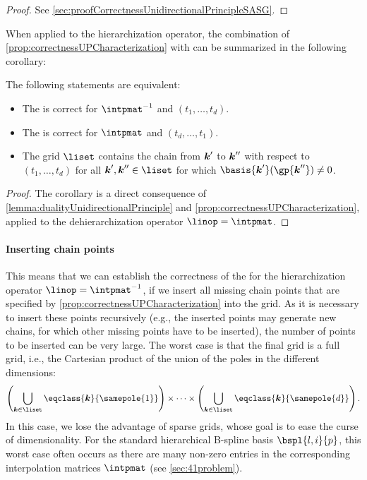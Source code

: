 \begin{proof}
  See \cref{sec:proofCorrectnessUnidirectionalPrincipleSASG}.
\end{proof}

When applied to the hierarchization operator,
the combination of \cref{prop:correctnessUPCharacterization} with
 can be summarized in
the following corollary:

\begin{corollary}
  \label{cor:equivalentCorrectnessUPHierarchization}
  The following statements are equivalent:
  \begin{itemize}
    \item
    The \up is correct for $\intpmatinv$ and $(t_1, \dotsc, t_d)$.
    
    \item
    The \up is correct for $\intpmat$ and $(t_d, \dotsc, t_1)$.
    
    \item
    The grid $\liset$ contains the chain from ${\boldsymbol{k}}'$ to ${\boldsymbol{k}}''$
    with respect to $(t_1, \dotsc, t_d)$ for all $\*k', \*k'' \in \liset$
    for which $\basis{\*k'}(\gp{\*k''}) \not= 0$.
  \end{itemize}
\end{corollary}

\begin{proof}
  The corollary is a direct consequence of
  \cref{lemma:dualityUnidirectionalPrinciple} and
  \cref{prop:correctnessUPCharacterization},
  applied to the dehierarchization operator $\linop = \intpmat$.
\end{proof}

\paragraph{Inserting chain points}

This means that we can establish the correctness of the \up
for the hierarchization operator $\linop = \intpmatinv$,
if we insert all missing chain points that are specified by
\cref{prop:correctnessUPCharacterization} into the grid.
As it is necessary to insert these points recursively
(e.g., the inserted points may generate new chains,
for which other missing points have to be inserted),
the number of points to be inserted can be very large.
The worst case is that the final grid is a full grid, i.e.,
the Cartesian product of the union of the poles in the different dimensions:
\begin{equation}
  \left(\bigcup_{\*k \in \liset} \eqclass{\*k}{\samepole{1}}\right)
  \times \dotsb \times
  \left(\bigcup_{\*k \in \liset} \eqclass{\*k}{\samepole{d}}\right).
\end{equation}
In this case, we lose the advantage of sparse grids,
whose goal is to ease the curse of dimensionality.
For the standard hierarchical B-spline basis $\bspl{l,i}{p}$,
this worst case often occurs as there are many non-zero entries
in the corresponding interpolation matrices $\intpmat$
(see \cref{sec:41problem}).



